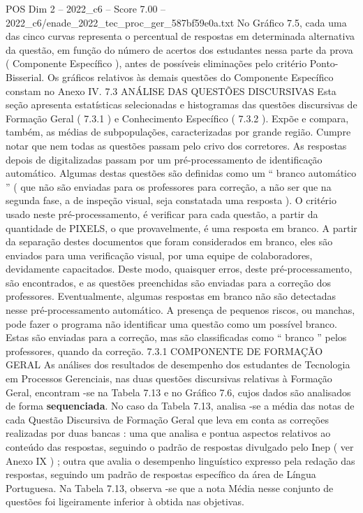 \begin{textsample}{POS Dim 2 – 2022\_c6 – Score 7.00 – 2022\_c6/enade\_2022\_tec\_proc\_ger\_587bf59e0a.txt}
No Gráfico 7.5, cada uma das cinco curvas representa o percentual de respostas em determinada alternativa da questão, em função do número de acertos dos estudantes nessa parte da prova ( Componente Específico ), antes de possíveis eliminações pelo critério Ponto-Bisserial.
Os gráficos relativos às demais questões do Componente Específico constam no Anexo IV. 7.3 ANÁLISE DAS QUESTÕES DISCURSIVAS Esta seção apresenta estatísticas selecionadas e histogramas das questões discursivas de Formação Geral ( 7.3.1 ) e Conhecimento Específico ( 7.3.2 ).
Expõe e compara, também, as médias de subpopulações, caracterizadas por grande região.
Cumpre notar que nem todas as questões passam pelo crivo dos corretores.
As respostas depois de digitalizadas passam por um pré-processamento de identificação automático.
Algumas destas questões são definidas como um “ branco automático ” ( que não são enviadas para os professores para correção, a não ser que na segunda fase, a de inspeção visual, seja constatada uma resposta ).
O critério usado neste pré-processamento, é verificar para cada questão, a partir da quantidade de PIXELS, o que provavelmente, é uma resposta em branco.
A partir da separação destes documentos que foram considerados em branco, eles são enviados para uma verificação visual, por uma equipe de colaboradores, devidamente capacitados.
Deste modo, quaisquer erros, deste pré-processamento, são encontrados, e as questões preenchidas são enviadas para a correção dos professores.
Eventualmente, algumas respostas em branco não são detectadas nesse pré-processamento automático.
A presença de pequenos riscos, ou manchas, pode fazer o programa não identificar uma questão como um possível branco.
Estas são enviadas para a correção, mas são classificadas como “ branco ” pelos professores, quando da correção. 7.3.1 COMPONENTE DE FORMAÇÃO GERAL As análises dos resultados de desempenho dos estudantes de Tecnologia em Processos Gerenciais, nas duas questões discursivas relativas à Formação Geral, encontram -se na Tabela 7.13 e no Gráfico 7.6, cujos dados são analisados de forma \textbf{sequenciada}.
No caso da Tabela 7.13, analisa -se a média das notas de cada Questão Discursiva de Formação Geral que leva em conta as correções realizadas por duas bancas : uma que analisa e pontua aspectos relativos ao conteúdo das respostas, seguindo o padrão de respostas divulgado pelo Inep ( ver Anexo IX ) ; outra que avalia o desempenho linguístico expresso pela redação das respostas, seguindo um padrão de respostas específico da área de Língua Portuguesa.
Na Tabela 7.13, observa -se que a nota Média nesse conjunto de questões foi ligeiramente inferior à obtida nas objetivas.

\end{textsample}
